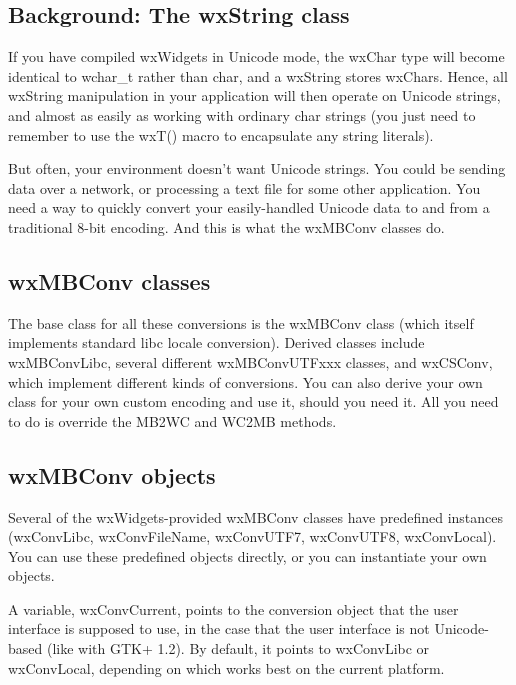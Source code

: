 \subsection{Background: The wxString class}\label{conversionandwxstring}

If you have compiled wxWidgets in Unicode mode, the wxChar type will become
identical to wchar\_t rather than char, and a wxString stores wxChars. Hence,
all wxString manipulation in your application will then operate on Unicode
strings, and almost as easily as working with ordinary char strings (you
just need to remember to use the wxT() macro to encapsulate any string
literals).

But often, your environment doesn't want Unicode strings. You could be sending
data over a network, or processing a text file for some other application. You
need a way to quickly convert your easily-handled Unicode data to and from a
traditional 8-bit encoding. And this is what the wxMBConv classes do.

\subsection{wxMBConv classes}\label{wxmbconvclasses}

The base class for all these conversions is the wxMBConv class (which itself
implements standard libc locale conversion). Derived classes include
wxMBConvLibc, several different wxMBConvUTFxxx classes, and wxCSConv, which
implement different kinds of conversions. You can also derive your own class
for your own custom encoding and use it, should you need it. All you need to do
is override the MB2WC and WC2MB methods.

\subsection{wxMBConv objects}\label{wxmbconvobjects}

Several of the wxWidgets-provided wxMBConv classes have predefined instances
(wxConvLibc, wxConvFileName, wxConvUTF7, wxConvUTF8, wxConvLocal). You can use
these predefined objects directly, or you can instantiate your own objects.

A variable, wxConvCurrent, points to the conversion object that the user
interface is supposed to use, in the case that the user interface is not
Unicode-based (like with GTK+ 1.2). By default, it points to wxConvLibc or
wxConvLocal, depending on which works best on the current platform.


